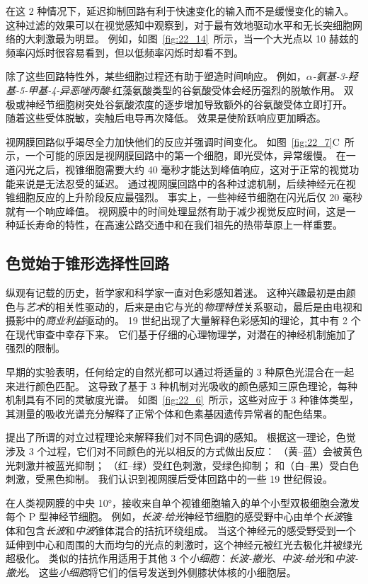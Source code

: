 在这 2 种情况下，延迟抑制回路有利于快速变化的输入而不是缓慢变化的输入。
这种过滤的效果可以在视觉感知中观察到，对于最有效地驱动水平和无长突细胞网络的大刺激最为明显。
例如，如图~\ref{fig:22_14}~所示，当一个大光点以 10 赫兹的频率闪烁时很容易看到，但以低频率闪烁时却看不到。


除了这些回路特性外，某些细胞过程还有助于塑造时间响应。
例如，\textit{$\alpha$-氨基-3-羟基-5-甲基-4-异恶唑丙酸}-红藻氨酸类型的谷氨酸受体会经历强烈的脱敏作用。
双极或神经节细胞树突处谷氨酸浓度的逐步增加导致额外的谷氨酸受体立即打开。
随着这些受体脱敏，突触后电导再次降低。
效果是使阶跃响应更加瞬态。


视网膜回路似乎竭尽全力加快他们的反应并强调时间变化。
如图~\ref{fig:22_7}C~所示，一个可能的原因是视网膜回路中的第一个细胞，即光受体，异常缓慢。
在一道闪光之后，视锥细胞需要大约 40 毫秒才能达到峰值响应，这对于正常的视觉功能来说是无法忍受的延迟。
通过视网膜回路中的各种过滤机制，后续神经元在视锥细胞反应的上升阶段反应最强烈。
事实上，一些神经节细胞在闪光后仅 20 毫秒就有一个响应峰值。
视网膜中的时间处理显然有助于减少视觉反应时间，这是一种延长寿命的特性，在高速公路交通中和在我们祖先的热带草原上一样重要。



\subsection{色觉始于锥形选择性回路}

纵观有记载的历史，哲学家和科学家一直对色彩感知着迷。
这种兴趣最初是由颜色与\textit{艺术}的相关性驱动的，后来是由它与光的\textit{物理特性}关系驱动，最后是由电视和摄影中的\textit{商业利益}驱动的。
19 世纪出现了大量解释色彩感知的理论，其中有 2 个在现代审查中幸存下来。
它们基于仔细的心理物理学，对潜在的神经机制施加了强烈的限制。


早期的实验表明，任何给定的自然光都可以通过将适量的 3 种原色光混合在一起来进行颜色匹配。
这导致了基于 3 种机制对光吸收的颜色感知三原色理论，每种机制具有不同的灵敏度光谱。
如图~\ref{fig:22_6}~所示，这些对应于 3 种锥体类型，其测量的吸收光谱充分解释了正常个体和色素基因遗传异常者的配色结果。


提出了所谓的对立过程理论来解释我们对不同色调的感知。
根据这一理论，色觉涉及 3 个过程，它们对不同颜色的光以相反的方式做出反应：
（黄–蓝）会被黄色光刺激并被蓝光抑制；
（红–绿）受红色刺激，受绿色抑制；
和（白–黑）受白色刺激，受黑色抑制。
我们认识到视网膜后受体回路中的一些 19 世纪假设。


在人类视网膜的中央 10°，接收来自单个视锥细胞输入的单个小型双极细胞会激发每个 P 型神经节细胞。
例如，\textit{长波-给光}神经节细胞的感受野中心由单个\textit{长波}锥体和包含\textit{长波}和\textit{中波}锥体混合的拮抗环绕组成。
当这个神经元的感受野受到一个延伸到中心和周围的大而均匀的光点的刺激时，这个神经元被红光去极化并被绿光超极化。
类似的拮抗作用适用于其他 3 个\textit{小细胞}：\textit{长波-撤光}、\textit{中波-给光}和\textit{中波-撤光}。
这些\textit{小细胞}将它们的信号发送到外侧膝状体核的小细胞层。


